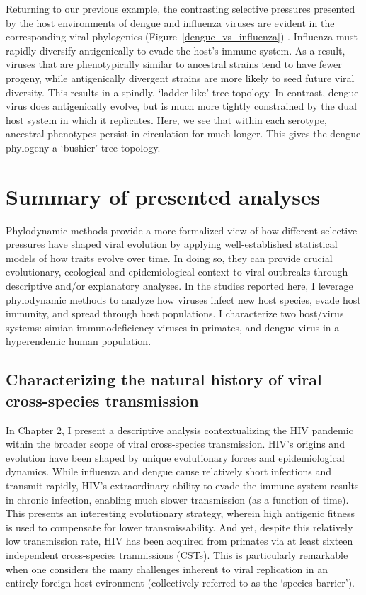 Returning to our previous example, the contrasting selective pressures presented by the host environments of dengue and influenza viruses are evident in the corresponding viral phylogenies (Figure~\ref{dengue_vs_influenza}) \citep{volz2013viral,bedford2011strength}.
Influenza must rapidly diversify antigenically to evade the host's immune system.
As a result, viruses that are phenotypically similar to ancestral strains tend to have fewer progeny, while antigenically divergent strains are more likely to seed future viral diversity.
This results in a spindly, `ladder-like' tree topology.
In contrast, dengue virus does antigenically evolve, but is much more tightly constrained by the dual host system in which it replicates.
Here, we see that within each serotype, ancestral phenotypes persist in circulation for much longer.
This gives the dengue phylogeny a `bushier' tree topology.

\section{Summary of presented analyses}
Phylodynamic methods provide a more formalized view of how different selective pressures have shaped viral evolution by applying well-established statistical models of how traits evolve over time.
In doing so, they can provide crucial evolutionary, ecological and epidemiological context to viral outbreaks through descriptive and/or explanatory analyses.
In the studies reported here, I leverage phylodynamic methods to analyze how viruses infect new host species, evade host immunity, and spread through host populations.
I characterize two host/virus systems: simian immunodeficiency viruses in primates, and dengue virus in a hyperendemic human population.

\subsection{Characterizing the natural history of viral cross-species transmission}
In Chapter 2, I present a descriptive analysis contextualizing the HIV pandemic within the broader scope of viral cross-species transmission.
HIV's origins and evolution have been shaped by unique evolutionary forces and epidemiological dynamics.
While influenza and dengue cause relatively short infections and transmit rapidly, HIV's extraordinary ability to evade the immune system results in chronic infection, enabling much slower transmission (as a function of time).
This presents an interesting evolutionary strategy, wherein high antigenic fitness is used to compensate for lower transmissability.
And yet, despite this relatively low transmission rate, HIV has been acquired from primates via at least sixteen independent cross-species tranmissions (CSTs).
This is particularly remarkable when one considers the many challenges inherent to viral replication in an entirely foreign host evironment (collectively referred to as the `species barrier').


